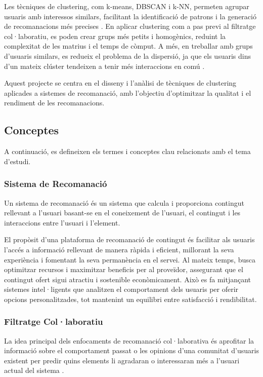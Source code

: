 \documentclass[a4paper,12pt]{report}
\begin{document}
Les tècniques de clustering, com k-means, DBSCAN i k-NN, permeten agrupar usuaris amb interessos similars, facilitant la identificació de patrons i la generació de recomanacions més precises \cite{jain2008data}.
En aplicar clustering com a pas previ al filtratge col·laboratiu, es poden crear grups més petits i homogènics, reduint la complexitat de les matrius i el temps de còmput.
A més, en treballar amb grups d'usuaris similars, es redueix el problema de la dispersió, ja que els usuaris dins d'un mateix clúster tendeixen a tenir més interaccions en comú \cite{Kantor_Ricci_Rokach_Shapira_2011}.

Aquest projecte se centra en el disseny i l'anàlisi de tècniques de clustering aplicades a sistemes de recomanació, amb l'objectiu d'optimitzar la qualitat i el rendiment de les recomanacions.

\subsection{Conceptes}

A continuació, es defineixen els termes i conceptes clau relacionats amb el tema d'estudi.

\subsubsection{Sistema de Recomanació}

Un sistema de recomanació és un sistema que calcula i proporciona contingut rellevant a l'usuari basant-se en el coneixement de l'usuari, el contingut i les interaccions entre l'usuari i l'element. \cite{falk2019practical}

El propòsit d’una plataforma de recomanació de contingut és facilitar als usuaris l’accés a informació rellevant de manera ràpida i eficient, millorant la seva experiència i fomentant la seva permanència en el servei. Al mateix temps, busca optimitzar recursos i maximitzar beneficis per al proveïdor, assegurant que el contingut ofert sigui atractiu i sostenible econòmicament. Això es fa mitjançant sistemes intel·ligents que analitzen el comportament dels usuaris per oferir opcions personalitzades, tot mantenint un equilibri entre satisfacció i rendibilitat.

\subsubsection{Filtratge Col·laboratiu}

La idea principal dels enfocaments de recomanació col·laborativa és aprofitar la informació sobre el comportament passat o les opinions d'una comunitat d'usuaris existent per predir quins elements li agradaran o interessaran més a l'usuari actual del sistema \cite{Jannach2011}.
\end{document}
